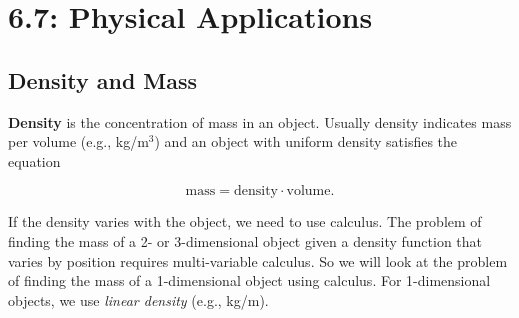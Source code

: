 \documentclass[12pt]{article}
\begin{document}
\section*{6.7: Physical Applications}


\vspace{5mm}

\subsection*{Density and Mass}

\textbf{Density} is the concentration of mass in an object. Usually density indicates mass per volume (e.g., kg/m$^3$) and an object with uniform density satisfies the equation

$$\text{mass}=\text{density}\cdot\text{volume}.$$

\vspace{3mm}

If the density varies with the object, we need to use calculus. The problem of finding the mass of a 2- or 3-dimensional object given a density function that varies by position requires multi-variable calculus. So we will look at the problem of finding the mass of a 1-dimensional object using calculus. For 1-dimensional objects, we use \textit{linear density} (e.g., kg/m).

\vspace{5mm}
\end{document}
